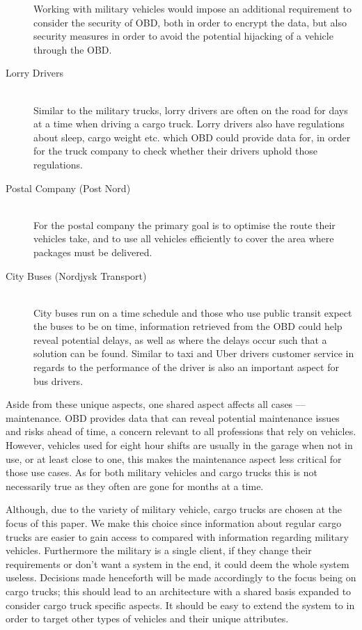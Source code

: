 \begin{description}
    Working with military vehicles would impose an additional requirement to consider the security of \ac{OBD}, both in order to encrypt the data, but also security measures in order to avoid the potential hijacking of a vehicle through the \ac{OBD}.
    \item [Lorry Drivers] \hfill \\
    Similar to the military trucks, lorry drivers are often on the road for days at a time when driving a cargo truck.
    Lorry drivers also have regulations about sleep, cargo weight etc. which \ac{OBD} could provide data for, in order for the truck company to check whether their drivers uphold those regulations.
    \item [Postal Company (Post Nord)] \hfill \\
    For the postal company the primary goal is to optimise the route their vehicles take, and to use all vehicles efficiently to cover the area where packages must be delivered.
    \item [City Buses (Nordjysk Transport)] \hfill \\
    City buses run on a time schedule and those who use public transit expect the buses to be on time, information retrieved from the \ac{OBD} could help reveal potential delays, as well as where the delays occur such that a solution can be found.
    Similar to taxi and Uber drivers customer service in regards to the performance of the driver is also an important aspect for bus drivers.
\end{description}

\bigskip
Aside from these unique aspects, one shared aspect affects all cases --- maintenance.
\ac{OBD} provides data that can reveal potential maintenance issues and risks ahead of time, a concern relevant to all professions that rely on vehicles.
However, vehicles used for eight hour shifts are usually in the garage when not in use, or at least close to one, this makes the maintenance aspect less critical for those use cases.
As for both military vehicles and cargo trucks this is not necessarily true as they often are gone for months at a time.

Although, due to the variety of military vehicle, cargo trucks are chosen at the focus of this paper.
We make this choice since information about regular cargo trucks are easier to gain access to compared with information regarding military vehicles.
Furthermore the military is a single client, if they change their requirements or don't want a system in the end, it could deem the whole system useless.
Decisions made henceforth will be made accordingly to the focus being on cargo trucks; this should lead to an architecture with a shared basis expanded to consider cargo truck specific aspects.
It should be easy to extend the system to in order to target other types of vehicles and their unique attributes.

